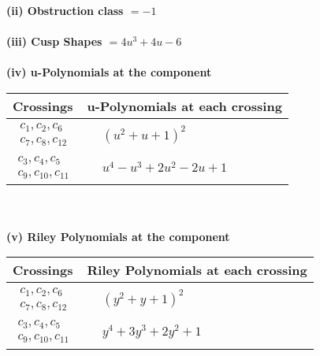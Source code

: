 \documentclass[1p]{elsarticle_modified}
\theoremstyle{definition}
\begin{document}
\flushleft \textbf{(ii) Obstruction class $= -1$}\\~\\
\flushleft \textbf{(iii) Cusp Shapes $= 4 u^3+4 u-6$}\\~\\
\newpage\renewcommand{\arraystretch}{1}
\flushleft \textbf{(iv) u-Polynomials at the component}\newline \\
\begin{tabular}{m{50pt}|m{274pt}}
Crossings & \hspace{64pt}u-Polynomials at each crossing \\
\hline $$\begin{aligned}c_{1},c_{2},c_{6}\\c_{7},c_{8},c_{12}\end{aligned}$$&$\begin{aligned}
&(u^2+u+1)^2
\end{aligned}$\\
\hline $$\begin{aligned}c_{3},c_{4},c_{5}\\c_{9},c_{10},c_{11}\end{aligned}$$&$\begin{aligned}
&u^4- u^3+2 u^2-2 u+1
\end{aligned}$\\
\hline
\end{tabular}\\~\\
\newpage\renewcommand{\arraystretch}{1}
\flushleft \textbf{(v) Riley Polynomials at the component}\newline \\
\begin{tabular}{m{50pt}|m{274pt}}
Crossings & \hspace{64pt}Riley Polynomials at each crossing \\
\hline $$\begin{aligned}c_{1},c_{2},c_{6}\\c_{7},c_{8},c_{12}\end{aligned}$$&$\begin{aligned}
&(y^2+y+1)^2
\end{aligned}$\\
\hline $$\begin{aligned}c_{3},c_{4},c_{5}\\c_{9},c_{10},c_{11}\end{aligned}$$&$\begin{aligned}
&y^4+3 y^3+2 y^2+1
\end{aligned}$\\
\hline
\end{tabular}\\~\\
\end{document}
